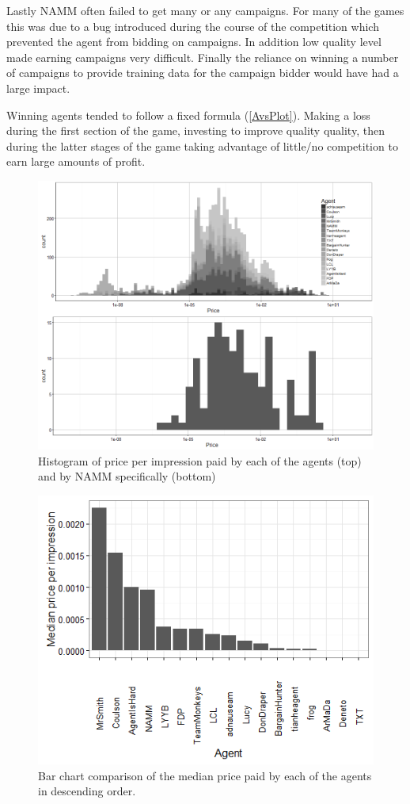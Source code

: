 \documentclass{sig-alternate-05-2015}
\begin{document}
Lastly NAMM often failed to get many or any campaigns. For many of the games this was due to a bug introduced during the course of the competition which prevented the agent from bidding on campaigns. In addition low quality level made earning campaigns very difficult. Finally the reliance on winning a number of campaigns to provide training data for the campaign bidder would have had a large impact.     

Winning agents tended to follow a fixed formula (\ref{AvsPlot}). Making a loss during the first section of the game, investing to improve quality quality, then during the latter stages of the game taking advantage of little/no competition to earn large amounts of profit.

\begin{figure}
\centering
\includegraphics[width = .9\linewidth]{PriceHist.png}
\caption{Histogram of price per impression paid by each of the agents (top) and by NAMM specifically (bottom)}
\label{PriceHist}
\end{figure}

\begin{figure}
\centering
\includegraphics[width = .9\linewidth]{PriceBar.png}
\caption{Bar chart comparison of the median price paid by each of the agents in descending order.}
\label{PriceBar}
\end{figure}
\end{document}
